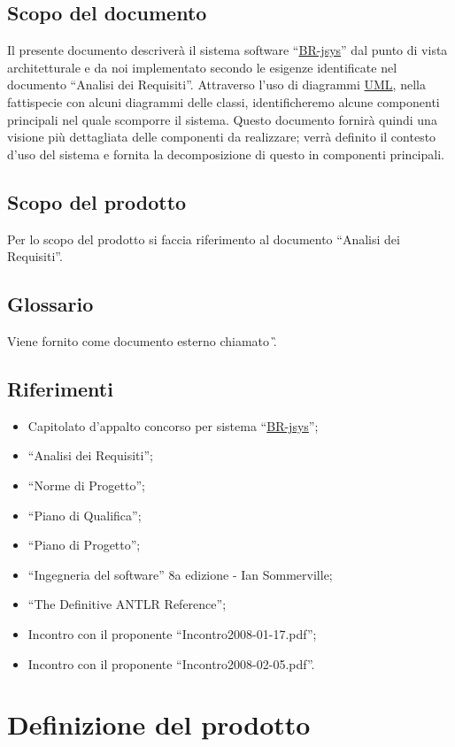 \section{Scopo del documento}
Il presente documento descriver\`a il sistema software ``\underline{BR-jsys}'' dal punto di vista architetturale e da noi implementato secondo le esigenze identificate nel documento ``Analisi dei Requisiti''. Attraverso l'uso di diagrammi \underline{UML}, nella fattispecie con alcuni diagrammi delle classi, identificheremo alcune componenti principali nel quale scomporre il sistema. Questo documento fornir\`a quindi una visione pi\`u dettagliata delle componenti da realizzare; verr\`a definito il contesto d'uso del sistema e fornita la decomposizione di questo in componenti principali.
\section{Scopo del prodotto}
Per lo scopo del prodotto si faccia riferimento al documento ``Analisi dei Requisiti''.
\section{Glossario}
Viene fornito come documento esterno chiamato \G .
\section{Riferimenti}
\begin{itemize}
\item Capitolato d'appalto concorso per sistema ``\underline{BR-jsys}'';
\item ``Analisi dei Requisiti'';
\item ``Norme di Progetto'';
\item ``Piano di Qualifica'';
\item ``Piano di Progetto'';
\item ``Ingegneria del software'' 8a edizione - Ian Sommerville;
\item ``The Definitive ANTLR Reference'';
\item Incontro con il proponente ``Incontro2008-01-17.pdf'';
\item Incontro con il proponente ``Incontro2008-02-05.pdf''.
\end{itemize}


\chapter{Definizione del prodotto}

